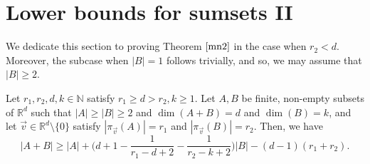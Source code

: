 \section{Lower bounds for sumsets II}



We dedicate this section to proving Theorem $\ref{mn2}$ in the case when $r_2 < d$. Moreover, the subcase when $|B| = 1$ follows trivially, and so, we may assume that $|B| \geq 2$.


\begin{theorem} \label{rszgn2}
Let $r_1, r_2, d, k\in \mathbb{N}$ satisfy $r_1 \geq d> r_2, k \geq 1$. Let $A,B$ be finite, non-empty subsets of $\mathbb{R}^d$ such that $|A| \geq |B| \geq 2$ and $\dim(A+B) = d$ and $\dim(B) =k$, and let $\vec{v} \in \mathbb{R}^d \setminus \{0\}$ satisfy $|\pi_{\vec{v}}(A)| = r_1$ and $|\pi_{\vec{v}}(B)| = r_2$. Then, we have
\[ |A+B| \geq |A| + \bigg( d+1 - \frac{1}{r_1 - d + 2} - \frac{1}{r_2 - k + 2} \bigg)|B| - (d-1)(r_1 + r_2) . \]
%
\end{theorem}

